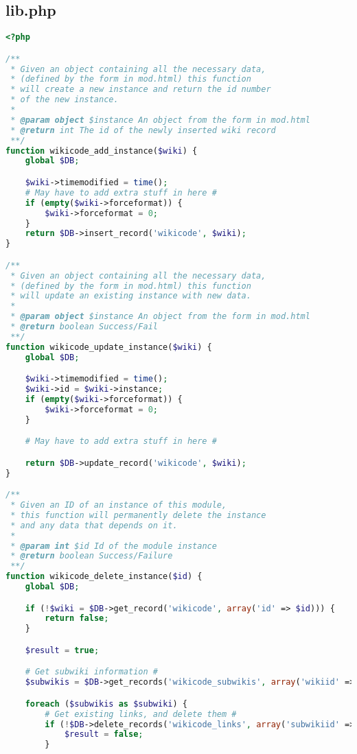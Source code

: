 \subsection{lib.php}
\begin{lstlisting}[language=PHP]
<?php

/**
 * Given an object containing all the necessary data,
 * (defined by the form in mod.html) this function
 * will create a new instance and return the id number
 * of the new instance.
 *
 * @param object $instance An object from the form in mod.html
 * @return int The id of the newly inserted wiki record
 **/
function wikicode_add_instance($wiki) {
    global $DB;

    $wiki->timemodified = time();
    # May have to add extra stuff in here #
    if (empty($wiki->forceformat)) {
        $wiki->forceformat = 0;
    }
    return $DB->insert_record('wikicode', $wiki);
}

/**
 * Given an object containing all the necessary data,
 * (defined by the form in mod.html) this function
 * will update an existing instance with new data.
 *
 * @param object $instance An object from the form in mod.html
 * @return boolean Success/Fail
 **/
function wikicode_update_instance($wiki) {
    global $DB;

    $wiki->timemodified = time();
    $wiki->id = $wiki->instance;
    if (empty($wiki->forceformat)) {
        $wiki->forceformat = 0;
    }

    # May have to add extra stuff in here #

    return $DB->update_record('wikicode', $wiki);
}

/**
 * Given an ID of an instance of this module,
 * this function will permanently delete the instance
 * and any data that depends on it.
 *
 * @param int $id Id of the module instance
 * @return boolean Success/Failure
 **/
function wikicode_delete_instance($id) {
    global $DB;

    if (!$wiki = $DB->get_record('wikicode', array('id' => $id))) {
        return false;
    }

    $result = true;

    # Get subwiki information #
    $subwikis = $DB->get_records('wikicode_subwikis', array('wikiid' => $wiki->id));

    foreach ($subwikis as $subwiki) {
        # Get existing links, and delete them #
        if (!$DB->delete_records('wikicode_links', array('subwikiid' => $subwiki->id), IGNORE_MISSING)) {
            $result = false;
        }


\end{lstlisting}
